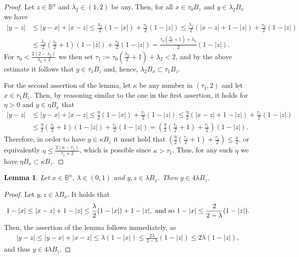 \documentclass[11pt,a4paper,reqno]{amsart}
\newtheorem{lem}[theorem]{Lemma}
\theoremstyle{definition}
\newcommand{\B}{\mathbb{B}^n}
\newcommand{\blue}{\color{blau}}
\newcounter{komcounter}
\numberwithin{komcounter}{section}
\newcommand{\komT}[1]{{\bf \blue [\refstepcounter{komcounter}\thekomcounter (by T): #1]}}
\begin{document}
\begin{proof}
	Let $z\in \B$ and $\lambda_2 \in (1,2)$ be any. Then, for all $x\in \tau_0 B_z$ and $y\in \lambda_2 B_x$ we have
	\begin{align*}
		|y-z|& \leq |y-x|+|x-z|\leq \frac{\lambda_2}{2}(1-|x|)+\frac{\tau_0}{2}(1-|z|)\leq \frac{\lambda_2}{2}(|x-z|+1-|z|) +\frac{\tau_0}{2}(1-|z|)\\
		&\leq \frac{\lambda_2}{2}(\frac{\tau_0}{2}+1)(1-|z|)+\frac{\tau_0}{2}(1-|z|)=\frac{\tau_0(\frac{\lambda_2}{2} +1)+\lambda_2}{2}(1-|z|).
	\end{align*}
	For $\tau_0< \frac{2(2-\lambda_2)}{\lambda_2+2}$ we then set $\tau_1 := \tau_0(\frac{\lambda_2}{2} +1)+\lambda_2<2$, and by the above estimate it follows that $y\in \tau_1 B_z$ and, hence, $\lambda_2 B_x\subset \tau_1 B_z$.
	
	For the second assertion of the lemma, let $\kappa$ be any number in $(\tau_1 ,2)$ and let $x\in \tau_1 B_z$. Then, by reasoning similar to the one in the first assertion, it holds for $\eta >0$ and $y\in \eta B_x$ that
	\begin{align*}
		|y-z|&\leq |y-x|+|x-z|\leq \frac{\eta}{2}(1-|x|)+\frac{\tau_1}{2}(1-|z|)\leq \frac{\eta }{2}(|x-z|+1-|z|) +\frac{\tau_1 }{2}(1-|z|)\\
		&\leq \frac{\eta }{2}(\frac{\tau_1}{2}+1)(1-|z|)+\frac{\tau_1}{2}(1-|z|)= (\frac{\eta}{2}(\frac{\tau_1}{2}+1)+\frac{\tau_1}{2})(1-|z|).
	\end{align*}
Therefore, in order to have $y\in \kappa B_z$ it must hold that $(\frac{\eta}{2}(\frac{\tau_1}{2}+1)+\frac{\tau_1}{2}) \leq \frac{\kappa}{2}$, or equivalently $\eta\leq \frac{2(\kappa -\tau_1)}{\tau_1 +2}$, which is possible since $\kappa >\tau_1$. Thus, for any such $\eta$ we have $\eta B_x\subset \kappa B_z$.
\end{proof}

\begin{lem}\label{lem:uniscale-balls2}
	Let $x\in\B$, $\lambda\in (0,1)$ and $y,z\in \lambda B_x$. Then $y\in 4\lambda B_z$. 
\end{lem}
\begin{proof}
	Let $y,z\in \lambda B_x$. It holds that
\[
1-|x|\leq |x-z|+1-|z|\leq \frac \lambda 2 (1-|x|)+1-|z|,\,\,\hbox{and so}\,\, 1-|x|\leq\frac{2}{2-\lambda}(1-|z|).
\]
Then, the assertion of the lemma follows immediately, as
\begin{align*}
|y-z|\leq |y-x|+|x-z|\leq \lambda (1-|x|)\leq\frac{2\lambda }{2-\lambda}(1-|z|)\leq 2\lambda (1-|z|),
\end{align*}
 and thus $y\in 4\lambda B_z$.
\end{proof}
\end{document}
